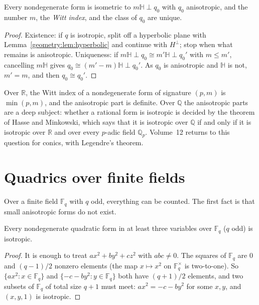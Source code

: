 \begin{corollary}\label{geometry:cor:wittindex}
Every nondegenerate form is isometric to $m\mathbb H\perp q_0$ with $q_0$ anisotropic, and the number $m$, the \emph{Witt index}, and the class of $q_0$
are unique.
\end{corollary}

\begin{proof}
Existence: if $q$ is isotropic, split off a hyperbolic plane with Lemma~\ref{geometry:lem:hyperbolic} and continue with $H^\perp$; stop when what remains is
anisotropic. Uniqueness: if $m\mathbb H\perp q_0\cong m'\mathbb H\perp q_0'$ with $m\le m'$, cancelling $m\mathbb H$ gives $q_0\cong(m'-m)\mathbb H\perp q_0'$.
As $q_0$ is anisotropic and $\mathbb H$ is not, $m'=m$, and then $q_0\cong q_0'$.
\end{proof}

Over $\mathbb R$, the Witt index of a nondegenerate form of signature $(p,m)$ is $\min(p,m)$, and the anisotropic part is definite. Over
$\mathbb Q$ the anisotropic parts are a deep subject: whether a rational form is isotropic is decided by the theorem of Hasse and Minkowski, which says
that it is isotropic over $\mathbb Q$ if and only if it is isotropic over $\mathbb R$ and over every $p$-adic field $\mathbb Q_p$. Volume~12 returns to
this question for conics, with Legendre's theorem.

\section{Quadrics over finite fields}

Over a finite field $\mathbb F_q$ with $q$ odd, everything can be counted. The first fact is that small anisotropic forms do not exist.

\begin{proposition}\label{geometry:prop:chevalley}
Every nondegenerate quadratic form in at least three variables over $\mathbb F_q$ ($q$ odd) is isotropic.
\end{proposition}

\begin{proof}
It is enough to treat $ax^2+by^2+cz^2$ with $abc\ne0$. The squares of $\mathbb F_q$ are $0$ and $(q-1)/2$ nonzero elements (the map $x\mapsto x^2$ on
$\mathbb F_q^\times$ is two-to-one). So $\{ax^2:x\in\mathbb F_q\}$ and $\{-c-by^2:y\in\mathbb F_q\}$ both have $(q+1)/2$ elements, and two subsets of
$\mathbb F_q$ of total size $q+1$ must meet: $ax^2=-c-by^2$ for some $x,y$, and $(x,y,1)$ is isotropic.
\end{proof}

